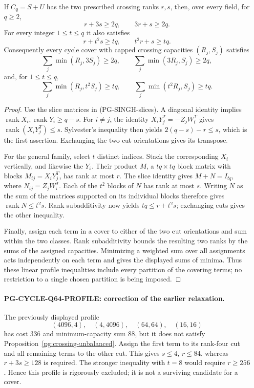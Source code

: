 \begin{proposition}
\label{pg:crossing-unbalanced}
If $C_q=S+U$ has the two prescribed crossing ranks $r,s$, then,
over every field, for $q\geq2$,
\[
 r+3s\geq2q,\qquad 3r+s\geq2q.
\]
For every integer $1\leq t\leq q$ it also satisfies
\[
 r+t^2s\geq tq,\qquad t^2r+s\geq tq.
 \tag{PG-CROSSING-unbalanced}
\]
Consequently every cycle cover with capped crossing capacities
$(R_j,S_j)$ satisfies
\[
 \sum_j\min(R_j,3S_j)\geq2q,\qquad
 \sum_j\min(3R_j,S_j)\geq2q,
\]
and, for $1\leq t\leq q$,
\[
 \sum_j\min(R_j,t^2S_j)\geq tq,\qquad
 \sum_j\min(t^2R_j,S_j)\geq tq.
 \tag{PG-CYCLE-unbalanced}
\]
\end{proposition}
\begin{proof}
Use the slice matrices in (PG-SINGH-slices). A diagonal identity
implies $\operatorname{rank}X_i,\operatorname{rank}Y_i\geq q-s$.
For $i\ne j$, the identity
$X_iY_j^T=-Z_jW_i^T$ gives
$\operatorname{rank}(X_iY_j^T)\leq s$. Sylvester's inequality
then yields $2(q-s)-r\leq s$, which is the first assertion.
Exchanging the two cut orientations gives its transpose.

For the general family, select $t$ distinct indices. Stack the
corresponding $X_i$ vertically, and likewise the $Y_i$.
Their product $M$, a $tq\times tq$ block matrix with blocks
$M_{ij}=X_iY_j^T$, has rank at most $r$. The slice identity gives
$M+N=I_{tq}$, where $N_{ij}=Z_jW_i^T$.
Each of the $t^2$ blocks of $N$ has rank at most $s$.
Writing $N$ as the sum of the matrices supported on its
individual blocks therefore gives $\operatorname{rank}N\leq t^2s$.
Rank subadditivity now yields $tq\leq r+t^2s$; exchanging cuts
gives the other inequality.

Finally, assign each term in a cover to either of the two cut
orientations and sum within the two classes. Rank subadditivity
bounds the resulting two ranks by the sums of the assigned
capacities. Minimizing a weighted sum over all assignments acts
independently on each term and gives the displayed sums of
minima. Thus these linear profile inequalities include every
partition of the covering terms; no restriction to a single
chosen partition is being imposed.
\end{proof}

\paragraph{PG-CYCLE-Q64-PROFILE: correction of the earlier relaxation.}
The previously displayed profile
\[
 (4096,4),\quad(4,4096),\quad(64,64),\quad(16,16)
\]
has cost $336$ and minimum-capacity sum $88$, but it does not
satisfy Proposition~\ref{pg:crossing-unbalanced}. Assign the first
term to its rank-four cut and all remaining terms to the other
cut. This gives $s\leq4$, $r\leq84$, whereas $r+3s\geq128$ is
required. The stronger inequality with $t=8$ would require
$r\geq256$. Hence this profile is rigorously excluded; it is
not a surviving candidate for a cover.

